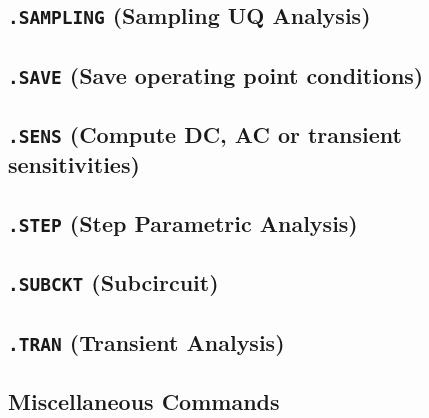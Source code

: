 \newpage
\subsection{\texttt{.SAMPLING} (Sampling UQ Analysis)}\label{.SAMPLING}


\newpage
\subsection{\texttt{.SAVE} (Save operating point conditions)}


\newpage
\subsection{\texttt{.SENS} (Compute DC, AC or transient sensitivities)}
\label{SensitivityAnalysis}


\newpage
\subsection{\texttt{.STEP} (Step Parametric Analysis)}\label{.STEP}


\newpage
\subsection{\texttt{.SUBCKT} (Subcircuit)}
\label{SubcircuitDefinition}


\newpage
\subsection{\texttt{.TRAN} (Transient Analysis)}


\newpage
\subsection{Miscellaneous Commands}
